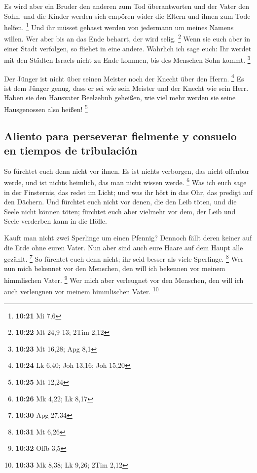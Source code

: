  Es wird aber ein Bruder den anderen zum Tod
überantworten und der Vater den Sohn, und die Kinder werden sich empören
wider die Eltern und ihnen zum Tode helfen. \footnote{\textbf{10:21} Mi
  7,6}  Und ihr müsset gehasst werden von jedermann um
meines Namens willen. Wer aber bis an das Ende beharrt, der wird selig.
\footnote{\textbf{10:22} Mt 24,9-13; 2Tim 2,12}  Wenn sie
euch aber in einer Stadt verfolgen, so fliehet in eine andere. Wahrlich
ich sage euch: Ihr werdet mit den Städten Israels nicht zu Ende kommen,
bis des Menschen Sohn kommt. \footnote{\textbf{10:23} Mt 16,28; Apg 8,1}

 Der Jünger ist nicht über seinen Meister noch der Knecht
über den Herrn. \footnote{\textbf{10:24} Lk 6,40; Joh 13,16; Joh 15,20}
 Es ist dem Jünger genug, dass er sei wie sein Meister
und der Knecht wie sein Herr. Haben sie den Hausvater Beelzebub
geheißen, wie viel mehr werden sie seine Hausgenossen also heißen!
\footnote{\textbf{10:25} Mt 12,24}

\hypertarget{aliento-para-perseverar-fielmente-y-consuelo-en-tiempos-de-tribulaciuxf3n}{%
\subsection{Aliento para perseverar fielmente y consuelo en tiempos de
tribulación}\label{aliento-para-perseverar-fielmente-y-consuelo-en-tiempos-de-tribulaciuxf3n}}

 So fürchtet euch denn nicht vor ihnen. Es ist nichts
verborgen, das nicht offenbar werde, und ist nichts heimlich, das man
nicht wissen werde. \footnote{\textbf{10:26} Mk 4,22; Lk 8,17}
 Was ich euch sage in der Finsternis, das redet im Licht;
und was ihr hört in das Ohr, das predigt auf den Dächern.
 Und fürchtet euch nicht vor denen, die den Leib töten,
und die Seele nicht können töten; fürchtet euch aber vielmehr vor dem,
der Leib und Seele verderben kann in die Hölle.

 Kauft man nicht zwei Sperlinge um einen Pfennig? Dennoch
fällt deren keiner auf die Erde ohne euren Vater.  Nun
aber sind auch eure Haare auf dem Haupt alle gezählt. \footnote{\textbf{10:30}
  Apg 27,34}  So fürchtet euch denn nicht; ihr seid
besser als viele Sperlinge. \footnote{\textbf{10:31} Mt 6,26}
 Wer nun mich bekennet vor den Menschen, den will ich
bekennen vor meinem himmlischen Vater. \footnote{\textbf{10:32} Offb 3,5}
 Wer mich aber verleugnet vor den Menschen, den will ich
auch verleugnen vor meinem himmlischen Vater. \footnote{\textbf{10:33}
  Mk 8,38; Lk 9,26; 2Tim 2,12}

